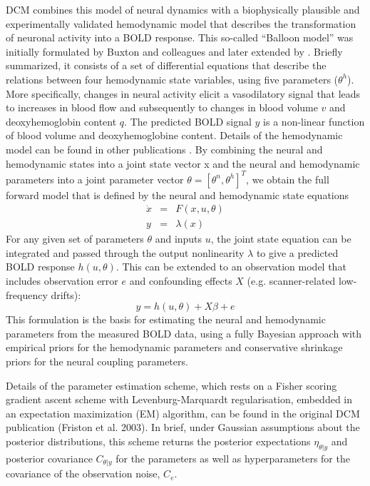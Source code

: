 DCM combines this model of neural dynamics with a biophysically plausible and experimentally validated hemodynamic model that describes the transformation of neuronal activity into a BOLD response.  This so-called ``Balloon model'' was initially formulated by Buxton and colleagues and later extended by \cite{balloon}.  Briefly summarized, it consists of a set of differential equations that describe the relations between four hemodynamic state variables, using five parameters ($\theta^h$).  More specifically, changes in neural activity elicit a vasodilatory signal that leads to increases in blood flow and subsequently to changes in blood volume $v$ and deoxyhemoglobin content $q$.  The predicted BOLD signal $y$ is a non-linear function of blood volume and deoxyhemoglobine content. Details of the hemodynamic model can be found in other publications \cite{balloon}.
By combining the neural and hemodynamic states into a joint state vector x and the neural and hemodynamic parameters into a joint parameter vector $\theta=[\theta^n, \theta^h]^T$, we obtain the full forward model that is defined by the neural and hemodynamic state equations
\begin{eqnarray}
\dot{x} & = & F(x,u,\theta) \\ \nonumber
y & = & \lambda(x)
\end{eqnarray}
For any given set of parameters $\theta$ and inputs $u$, the joint state equation can be integrated and passed through the output nonlinearity $\lambda$ to give a predicted BOLD response $h(u,\theta)$.  This can be extended to an observation model that includes observation error $e$ and confounding effects $X$ (e.g. scanner-related low-frequency drifts):
\begin{equation}
y = h(u,\theta) + X \beta + e
\end{equation}
This formulation is the basis for estimating the neural and hemodynamic parameters from the measured BOLD data, using a fully Bayesian approach with empirical priors for the hemodynamic parameters and conservative shrinkage priors for the neural coupling parameters.

Details of the parameter estimation scheme, which rests on a Fisher scoring gradient ascent scheme with Levenburg-Marquardt regularisation, embedded in an expectation maximization (EM) algorithm, can be found in the original DCM publication (Friston et al. 2003).  In brief, under Gaussian assumptions about the posterior distributions, this scheme returns the posterior expectations $\eta_{\theta | y}$ and posterior covariance  $C_{\theta | y}$ for the parameters as well as hyperparameters for the covariance of the observation noise, $C_e$.

